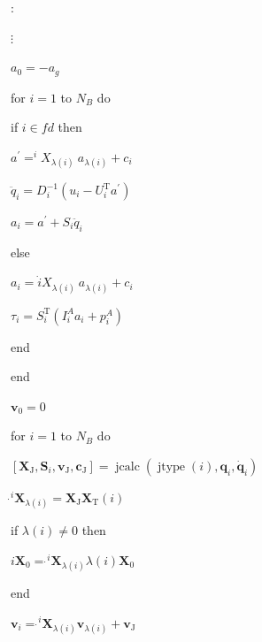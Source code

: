 \documentclass[10pt,a4paper]{book}
\theoremstyle{thmstyle} %
\theoremstyle{defstyle} %
\theoremstyle{prostyle} %
\begin{document}
:



$\vdots$



$a_{0}=-a_{g}$



for $i=1$ to $N_{B}$ do



if $i\in fd$ then



$a^{\prime}=^{i}X_{\lambda(i)}\ a_{\lambda(i)}+c_{i}$



$\ddot{q}_{i}=D_{i}^{-1}(u_{i}-U_{i}^{\mathrm{T}}a^{\prime})$



$a_{i}=a^{\prime}+S_{i}\ddot{q}_{i}$



else



$a_{i}=\dot{i}X_{\lambda(i)}\ a_{\lambda(i)}+c_{i}$



$\tau_{i}=S_{i}^{\mathrm{T}}(I_{i}^{A}a_{i}+p_{i}^{A})$



end



end



$\boldsymbol{v}_{0}=0$



for $i=1$ to $N_{B}$ do



$\left[\boldsymbol{X}_{\mathrm{J}}, \boldsymbol{S}_{i}, \boldsymbol{v}_{\mathrm{J}}, \boldsymbol{c}_{\mathrm{J}}\right]=\operatorname{jcalc}(\operatorname{jtype}(i), \boldsymbol{q}_{i}, \dot{\boldsymbol{q}}_{i})$



$\dot{}^{i} \boldsymbol{X}_{\lambda(i)}=\boldsymbol{X}_{\mathrm{J}} \boldsymbol{X}_{\mathrm{T}}(i)$



if $\lambda(i) \neq 0$ then



$ i \boldsymbol{X}_{0}=\dot{}^{i} \boldsymbol{X}_{\lambda(i)} \lambda(i) \boldsymbol{X}_{0}$



end



$\boldsymbol{v}_{i}=\dot{}^{i} \boldsymbol{X}_{\lambda(i)} \boldsymbol{v}_{\lambda(i)}+\boldsymbol{v}_{\mathrm{J}}$
\end{document}
